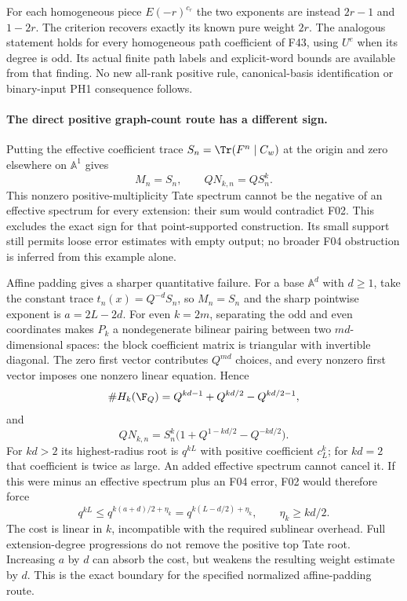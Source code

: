 \documentclass[11pt,a4paper]{article}
\newcommand{\A}{\mathbb A}\newcommand{\PP}{\mathbb P}\newcommand{\GL}{\mathrm{GL}}
\newcommand{\fid}[1]{\textsf{#1}}\newcommand{\gate}[1]{\textsf{#1}}
\theoremstyle{named}\newtheorem{finding}{Finding}[section]
\theoremstyle{definition}\newtheorem{definition}[finding]{Definition}
\theoremstyle{remark}\newtheorem{remark}[finding]{Remark}
\begin{document}
For each homogeneous piece $E(-r)^{c_r}$ the two exponents
are instead $2r-1$ and $1-2r$. The criterion recovers
exactly its known pure weight $2r$. The analogous statement
holds for every homogeneous path coefficient of \fid{F43},
using $U^e$ when its degree is odd. Its actual finite path
labels and explicit-word bounds are available from that
finding. No new all-rank positive rule, canonical-basis
identification or binary-input PH1 consequence follows.

\paragraph{The direct positive graph-count route has a different sign.}
Putting the effective coefficient trace $S_n=\Tr(F^n\mid C_w)$
at the origin and zero elsewhere on $\A^1$ gives
\[
 M_n=S_n,\qquad QN_{k,n}=QS_n^k.
\]
This nonzero positive-multiplicity Tate spectrum cannot be
the negative of an effective spectrum for every extension:
their sum would contradict \fid{F02}. This excludes the
exact sign for that point-supported construction. Its
small support still permits loose error estimates with
empty output; no broader \fid{F04} obstruction is inferred
from this example alone.

Affine padding gives a sharper quantitative failure.
For a base $\A^d$ with $d\ge1$, take the constant trace
$t_n(x)=Q^{-d}S_n$, so $M_n=S_n$ and the sharp pointwise
exponent is $a=2L-2d$. For even $k=2m$, separating the
odd and even coordinates makes $P_k$ a nondegenerate
bilinear pairing between two $md$-dimensional spaces:
the block coefficient matrix is triangular with invertible
diagonal. The zero first vector contributes $Q^{md}$
choices, and every nonzero first vector imposes one
nonzero linear equation. Hence
\[
 \#H_k(\F_Q)=Q^{kd-1}+Q^{kd/2}-Q^{kd/2-1},
\]
and
\[
 QN_{k,n}=S_n^k
             \bigl(1+Q^{1-kd/2}-Q^{-kd/2}\bigr).
\]
For $kd>2$ its highest-radius root is $q^{kL}$ with
positive coefficient $c_L^k$; for $kd=2$ that coefficient
is twice as large. An added effective spectrum cannot
cancel it. If this were minus an effective spectrum plus
an \fid{F04} error, \fid{F02} would therefore force
\[
 q^{kL}\le q^{k(a+d)/2+\eta_k}
              =q^{k(L-d/2)+\eta_k},
 \qquad \eta_k\ge kd/2.
\]
The cost is linear in $k$, incompatible with the required
sublinear overhead. Full extension-degree progressions
do not remove the positive top Tate root.
Increasing $a$ by $d$ can absorb the cost, but weakens
the resulting weight estimate by $d$. This is the exact
boundary for the specified normalized affine-padding route.
\end{document}
